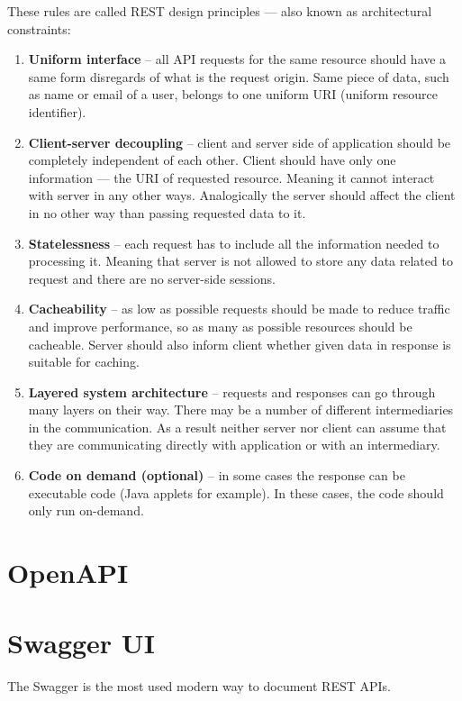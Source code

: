 These rules are called REST design principles --- also known as architectural constraints:
\cite{ibmrest}
\begin{enumerate}
    \item \textbf{Uniform interface} -- all API requests for the same resource should have a same form disregards of what is the request origin. Same piece of data, such as name or email of a user, belongs to one uniform URI (uniform resource identifier).
    \item \textbf{Client-server decoupling} -- client and server side of application should be completely independent of each other. Client should have only one information --- the URI of requested resource. Meaning it cannot interact with server in any other ways. Analogically the server should affect the client in no other way than passing requested data to it.
    \item \textbf{Statelessness} -- each request has to include all the information needed to processing it. Meaning that server is not allowed to store any data related to request and there are no server-side sessions.
    \item \textbf{Cacheability} -- as low as possible requests should be made to reduce traffic and improve performance, so as many as possible resources should be cacheable. Server should also inform client whether given data in response is suitable for caching.
    \item \textbf{Layered system architecture} -- requests and responses can go through many layers on their way. There may be a number of different intermediaries in the communication. As a result neither server nor client can assume that they are communicating directly with application or with an intermediary.
    \item \textbf{Code on demand (optional)} -- in some cases the response can be executable code (Java applets for example). In these cases, the code should only run on-demand.
\end{enumerate}


\section{OpenAPI} \label{sec:openapi}


\section{Swagger UI} \label{sec:swagger}
The Swagger is the most used modern way to document REST APIs.
\cite{swagger}


